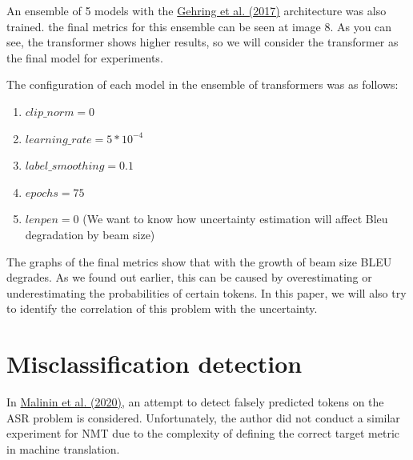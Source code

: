 \documentclass[a4paper,14pt]{extarticle}
\newcommand{\bibref}[3]{\hyperlink{#1}{#2 (#3)}}
\begin{document}
	An ensemble of 5 models with the \bibref{fconv}{Gehring et al.}{2017} architecture was also trained. the final metrics for this ensemble can be seen at image 8. As you can see, the transformer shows higher results, so we will consider the transformer as the final model for experiments.
	
	\begin{figure}[t]
	\end{figure}
	
	The configuration of each model in the ensemble of transformers was as follows:
	\begin{enumerate}
		\item $clip\_norm = 0$
		\item $learning\_rate=5*10^{-4}$
		\item $label\_smoothing=0.1$
		\item $epochs=75$
		\item $lenpen=0$ (We want to know how uncertainty estimation will affect Bleu degradation by beam size)
	\end{enumerate}
	
	The graphs of the final metrics show that with the growth of beam size BLEU degrades. As we found out earlier, this can be caused by overestimating or underestimating the probabilities of certain tokens. In this paper, we will also try to identify the correlation of this problem with the uncertainty.
	
\section{Misclassification detection}
	In \bibref{uncertainty}{Malinin et al.} {2020}, an attempt to detect falsely predicted tokens on the ASR problem is considered. Unfortunately, the author did not conduct a similar experiment for NMT due to the complexity of defining the correct target metric in machine translation.
\end{document}
